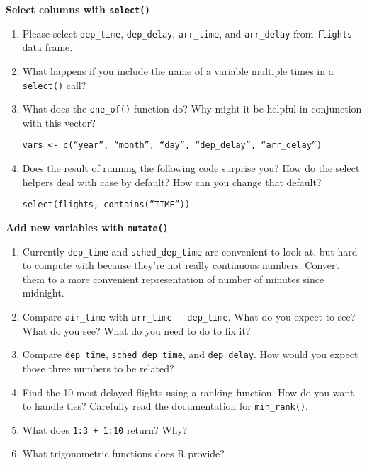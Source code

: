 \documentclass[11pt,a4paper]{article}
\begin{document}
\noindent \textbf{Select columns with \texttt{select()}}

\begin{enumerate}
	\item Please select \texttt{dep\_time}, \texttt{dep\_delay}, \texttt{arr\_time}, and \texttt{arr\_delay} from \texttt{flights} data frame.
	
	\item What happens if you include the name of a variable multiple times in a \texttt{select()} call?
	
	\item What does the \texttt{one\_of()} function do? Why might it be helpful in conjunction with this vector?
	
	\texttt{vars <- c(``year'', ``month'', ``day'', ``dep\_delay'', ``arr\_delay'')}
	
	\item Does the result of running the following code surprise you? How do the select helpers deal with case by default? How can you change that default?
	
	\texttt{select(flights, contains(``TIME''))}
	
\end{enumerate}

\noindent \textbf{Add new variables with \texttt{mutate()}}

\begin{enumerate}
	\item Currently \texttt{dep\_time} and \texttt{sched\_dep\_time} are convenient to look at, but hard to compute with because they're not really continuous numbers. Convert them to a more convenient representation of number of minutes since midnight.
	
	\item Compare \texttt{air\_time} with \texttt{arr\_time - dep\_time}. What do you expect to see? What do you see? What do you need to do to fix it?
	
	\item Compare \texttt{dep\_time}, \texttt{sched\_dep\_time}, and \texttt{dep\_delay}. How would you expect those three numbers to be related?
	
	\item Find the 10 most delayed flights using a ranking function. How do you want to handle ties? Carefully read the documentation for \texttt{min\_rank()}.
	
	\item What does \texttt{1:3 + 1:10} return? Why?
	
	\item What trigonometric functions does R provide?
	
\end{enumerate}
\end{document}
